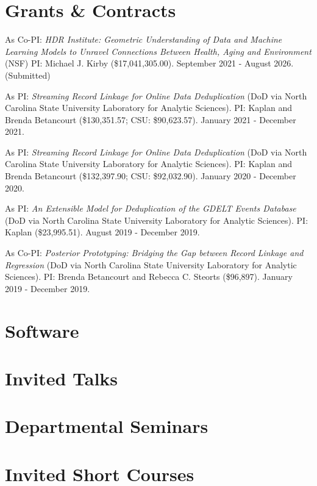 \documentclass[margin,line]{res}
\begin{document}
\begin{resume}
\section{\sc Grants \& Contracts}
As Co-PI: {\em HDR Institute: Geometric Understanding of Data and Machine Learning Models to Unravel Connections Between Health, Aging and Environment} (NSF) PI: Michael J. Kirby (\$17,041,305.00). September 2021 - August 2026. (Submitted)

As PI: {\em Streaming Record Linkage for Online Data Deduplication} (DoD via North Carolina State University Laboratory for Analytic Sciences). PI: Kaplan and Brenda Betancourt (\$130,351.57; CSU: \$90,623.57). January 2021 - December 2021.

As PI: {\em Streaming Record Linkage for Online Data Deduplication} (DoD via North Carolina State University Laboratory for Analytic Sciences). PI: Kaplan and Brenda Betancourt (\$132,397.90; CSU: \$92,032.90). January 2020 - December 2020.

As PI: {\em An Extensible Model for Deduplication of the GDELT Events Database} (DoD via North Carolina State University Laboratory for Analytic Sciences). PI: Kaplan (\$23,995.51). August 2019 - December 2019.

As Co-PI: {\em Posterior Prototyping: Bridging the Gap between Record Linkage and Regression} (DoD via North Carolina State University Laboratory for Analytic Sciences). PI: Brenda Betancourt and Rebecca C. Steorts (\$96,897). January 2019 - December 2019.

\section{\sc Software}
\printbibliography[keyword=packages, heading=none, resetnumbers=true]

\section{\sc Invited Talks}
\printbibliography[keyword=talk-invited, heading=none, resetnumbers=true]

\section{\sc Departmental Seminars}
\printbibliography[keyword=seminar, heading=none, resetnumbers=true]

\section{\sc Invited Short Courses}


\end{resume}
\end{document}
